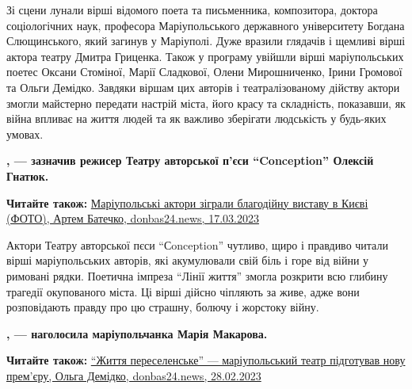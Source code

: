 Зі сцени лунали вірші відомого поета та письменника, композитора, доктора
соціологічних наук, професора Маріупольського державного університету Богдана
Слющинського, який загинув у Маріуполі. Дуже вразили глядачів і щемливі вірші
актора театру Дмитра Гриценка. Також у програму увійшли вірші маріупольських
поетес Оксани Стоміної, Марії Сладкової, Олени Мирошниченко, Ірини Громової та
Ольги Демідко. Завдяки віршам цих авторів і театралізованому дійству актори
змогли майстерно передати настрій міста, його красу та складність, показавши,
як війна впливає на життя людей та як важливо зберігати людськість у будь-яких
умовах.


\begin{leftbar}
	\begingroup
		\bfseries
{}, — зазначив режисер Театру авторської п'єси
\enquote{Conception} Олексій Гнатюк.
	\endgroup
\end{leftbar}

\textbf{Читайте також:} \href{https://donbas24.news/news/mariupolski-aktori-zigrali-blagodiinu-vistavu-v-kijevi-foto}{%
Маріупольські актори зіграли благодійну виставу в Києві (ФОТО), Артем Батечко, donbas24.news, 17.03.2023}


Актори Театру авторської пєси \enquote{Сonception} чутливо, щиро і правдиво читали
вірші маріупольських авторів, які акумулювали свій біль і горе від війни у
римовані рядки. Поетична імпреза \enquote{Лінії життя} змогла розкрити всю глибину
трагедії окупованого міста. Ці вірші дійсно чіпляють за живе, адже вони
розповідають правду про цю страшну, болючу і жорстоку війну.

\begin{leftbar}
	\begingroup
		\bfseries
{}, —
наголосила маріупольчанка Марія Макарова. 
	\endgroup
\end{leftbar}

\textbf{Читайте також:} \href{https://donbas24.news/news/zittya-pereselenske-mariupolskii-teatr-pidgotuvav-novu-premjeru}{%
\enquote{Життя переселенське} — маріупольський театр підготував нову прем'єру, %
Ольга Демідко, donbas24.news, 28.02.2023}

